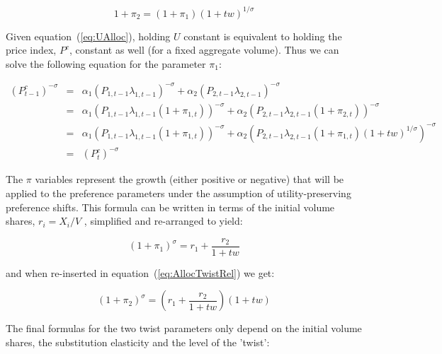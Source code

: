 \begin{equation}
\label{eq:AllocTwistRel}
1+\pi_2=\left(1+\pi_1\right) \left(1+\mathit{tw}\right)^{1/\sigma}
\end{equation}

Given equation~(\ref{eq:UAlloc}), holding $U$
constant is equivalent to holding the price index, $P^c$, constant as well (for
a fixed aggregate volume). Thus we can solve the following equation
for the parameter $\pi_1$:

\begin{displaymath}
\begin{array}{*{35}{l}}
\left(P^c_{t-1}\right)^{-\sigma } & = &
\alpha_1
\left( P_{1,t-1} \lambda_{1,t-1}
\right)^{-\sigma}
+\alpha_2
\left( P_{2,t-1} \lambda_{2,t-1}
\right)^{-\sigma} \\
{} & = & \alpha_1
\left( P_{1,t-1} \lambda_{1,t-1} \left(1+\pi_{1,t} \right)
\right)^{-\sigma}
+\alpha_2
\left( P_{2,t-1} \lambda_{2,t-1} \left(1+\pi_{2,t} \right)
\right)^{-\sigma} \\
{} & = & \alpha_1
\left( P_{1,t-1} \lambda_{1,t-1} \left(1+\pi_{1,t} \right)
\right)^{-\sigma}
+\alpha_2
\left( P_{2,t-1} \lambda_{2,t-1} \left(1+\pi_{1,t} \right) \left(1+\mathit{tw}\right)^{1/\sigma}
\right)^{-\sigma} \\
{} & = & \left(P^c_{t}\right)^{-\sigma }
\end{array}
\end{displaymath}

\noindent The $\pi$ variables represent the growth (either positive or negative) that will be applied to the
preference parameters under the assumption of utility-preserving preference shifts.
This formula can be written in terms of the initial volume shares, $r_i=X_i/V$ , simplified
and re-arranged to yield:

\begin{displaymath}
\left(1+\pi_1\right)^\sigma=r_1+\frac{r_2}{1+\mathit{tw}}
\end{displaymath}

\noindent and when re-inserted in equation~(\ref{eq:AllocTwistRel}) we get:

\begin{displaymath}
\left(1+\pi_2\right)^\sigma = \left(r_1+\frac{r_2}{1+\mathit{tw}} \right) \left(1+\mathit{tw}\right)
\end{displaymath}

\noindent The final formulas for the two twist parameters only depend on the initial
volume shares, the substitution elasticity and the level of the 'twist':

